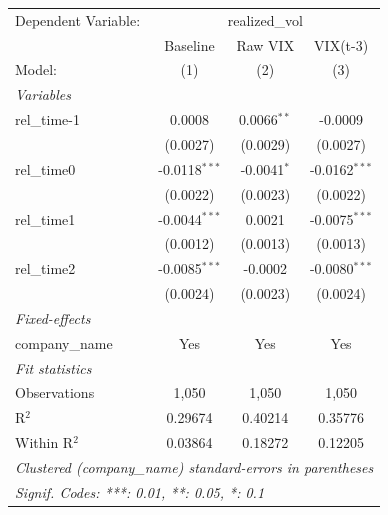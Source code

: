 
\begingroup
\centering
\begin{tabular}{lccc}
   \tabularnewline \midrule \midrule
   Dependent Variable: & \multicolumn{3}{c}{realized\_vol}\\
                  & Baseline        & Raw VIX       & VIX(t-3) \\   
   Model:         & (1)             & (2)           & (3)\\  
   \midrule
   \emph{Variables}\\
   rel\_time-1    & 0.0008          & 0.0066$^{**}$ & -0.0009\\   
                  & (0.0027)        & (0.0029)      & (0.0027)\\   
   rel\_time0     & -0.0118$^{***}$ & -0.0041$^{*}$ & -0.0162$^{***}$\\   
                  & (0.0022)        & (0.0023)      & (0.0022)\\   
   rel\_time1     & -0.0044$^{***}$ & 0.0021        & -0.0075$^{***}$\\   
                  & (0.0012)        & (0.0013)      & (0.0013)\\   
   rel\_time2     & -0.0085$^{***}$ & -0.0002       & -0.0080$^{***}$\\   
                  & (0.0024)        & (0.0023)      & (0.0024)\\   
   \midrule
   \emph{Fixed-effects}\\
   company\_name  & Yes             & Yes           & Yes\\  
   \midrule
   \emph{Fit statistics}\\
   Observations   & 1,050           & 1,050         & 1,050\\  
   R$^2$          & 0.29674         & 0.40214       & 0.35776\\  
   Within R$^2$   & 0.03864         & 0.18272       & 0.12205\\  
   \midrule \midrule
   \multicolumn{4}{l}{\emph{Clustered (company\_name) standard-errors in parentheses}}\\
   \multicolumn{4}{l}{\emph{Signif. Codes: ***: 0.01, **: 0.05, *: 0.1}}\\
\end{tabular}
\par\endgroup


